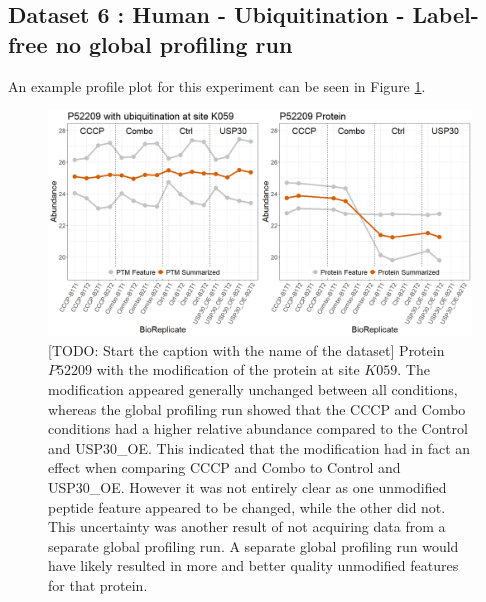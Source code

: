 \documentclass{mcp}
\def\todo#1{{\color{red}[TODO: #1]}}
\begin{document}
\clearpage

\subsection{Dataset 6 : Human - Ubiquitination - Label-free no global profiling run}
\label{sec:usp30}

An example profile plot for this experiment can be seen in  Figure \ref{fig:USP30_profile_plot}.

\begin{figure}[h!]
\centering
\includegraphics[width=\textwidth]{sim_new/USP30_profile_plot}
\caption{\todo{Start the caption with the name of the dataset} Protein $P52209$ with the modification of the protein at site $K059$. The modification appeared generally unchanged between all conditions, whereas the global profiling run showed that the CCCP and Combo conditions had a higher relative abundance compared to the Control and USP30\_OE. This indicated that the modification had in fact an effect when comparing CCCP and Combo to Control and USP30\_OE. However it was not entirely clear as one unmodified peptide feature appeared to be changed, while the other did not. This uncertainty was another result of not acquiring data from a separate global profiling run. A separate global profiling run would have likely resulted in more and better quality unmodified features for that protein. }
\label{fig:USP30_profile_plot}
\end{figure}


\clearpage

\printbibliography 
\end{document}
